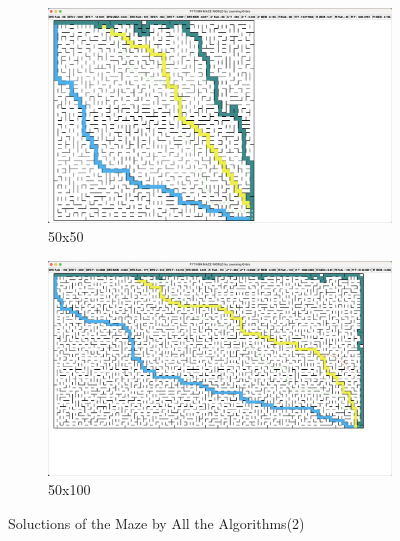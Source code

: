 \documentclass{article}
\begin{document}
\begin{figure}[p]
    \centering
    \begin{subfigure}[b]{1\textwidth}
        \centering
        \includegraphics[width=1\textwidth]{imgs/s_50.eps}
        \caption{50x50}
    \end{subfigure}
    \newline
    \begin{subfigure}[b]{1\textwidth}
        \centering
        \includegraphics[width=1\textwidth]{imgs/s_50_100.eps}
        \caption{50x100}
    \end{subfigure}
    \caption{Soluctions of the Maze by All the Algorithms(2)}
\end{figure}

\newpage


\newpage
\appendix
\end{document}
